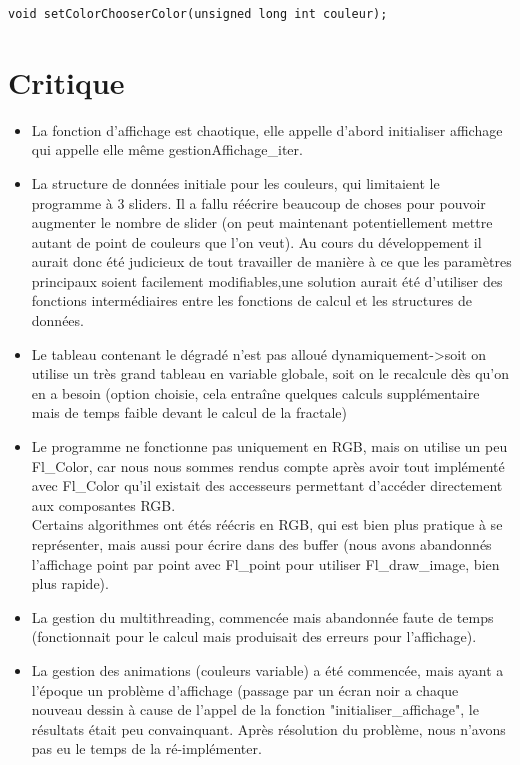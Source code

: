 \documentclass[a4paper,11pt]{article} \usepackage[T1]{fontenc} \usepackage[utf8]{inputenc} \usepackage[francais]{babel}
\begin{document}
\begin{lstlisting}
void setColorChooserColor(unsigned long int couleur);\end{lstlisting}


\section{Critique}

\begin{itemize}
\item La fonction d'affichage est chaotique, elle appelle d'abord initialiser affichage qui appelle elle même gestionAffichage\_iter.%
\item La structure de données initiale pour les couleurs, qui limitaient le programme à 3 sliders. Il a fallu réécrire beaucoup de choses pour pouvoir augmenter le nombre de slider (on peut maintenant potentiellement mettre autant de point de couleurs que l'on veut). Au cours du développement il aurait donc été judicieux de tout travailler de manière à ce que les paramètres principaux soient facilement modifiables,une solution aurait été d'utiliser des fonctions intermédiaires entre les fonctions de calcul et les structures de données.
\item Le tableau contenant le dégradé n'est pas alloué dynamiquement->soit on utilise un très grand tableau en variable globale, soit on le recalcule dès qu'on en a besoin (option choisie, cela entraîne quelques calculs supplémentaire mais de temps faible devant le calcul de la fractale)
\item Le programme ne fonctionne pas uniquement en RGB, mais on utilise un peu Fl\_Color, car nous nous sommes rendus compte après avoir tout implémenté avec Fl\_Color qu'il existait des accesseurs permettant d’accéder directement aux composantes RGB.\\
Certains algorithmes ont étés réécris en RGB, qui est bien plus pratique à se représenter, mais aussi pour écrire dans des buffer (nous avons abandonnés l'affichage point par point avec Fl\_point pour utiliser Fl\_draw\_image, bien plus rapide).
\item La gestion du multithreading, commencée mais abandonnée faute de temps (fonctionnait pour le calcul mais produisait des erreurs pour l'affichage).
\item La gestion des animations (couleurs variable) a été commencée, mais ayant a l'époque un problème d'affichage (passage par un écran noir a chaque nouveau dessin à cause de l'appel de la fonction "initialiser\_affichage", le résultats était peu convainquant. Après résolution du problème, nous n'avons pas eu le temps de la ré-implémenter.
\end{itemize}
\end{document}
